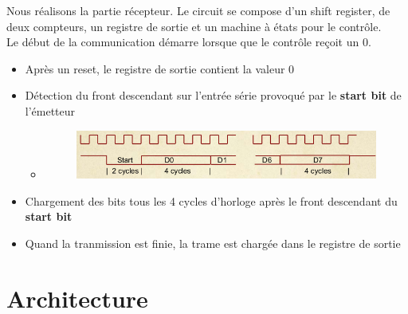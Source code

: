\documentclass[a4paper]{article} %
\begin{document}


\begin{tcolorbox}[colframe=Monokaimagenta,colback=white]
Nous réalisons la partie récepteur. Le circuit se compose d'un shift register, de deux compteurs, un registre de sortie et un machine à états pour le contrôle.\\
Le début de la communication démarre lorsque que le contrôle reçoit un $0$.

\begin{itemize}
    \item    Après un reset, le registre de sortie contient la valeur $0$
    \item    Détection du front descendant sur l'entrée série provoqué par le \textbf{start bit} de l'émetteur
        \begin{itemize}
            \item    \begin{figure}[H]
                        \centering
                        \includegraphics[width=.8\textwidth]{src/chrono_emetteur.jpg}
                     \label{fig:trame}
                \end{figure}
        \end{itemize}
    \item    Chargement des bits tous les 4 cycles d'horloge après le front descendant du \textbf{start bit}
    \item    Quand la tranmission est finie, la trame est chargée dans le registre de sortie
    
\end{itemize}   
\end{tcolorbox}

\section{Architecture}\
\end{document}
